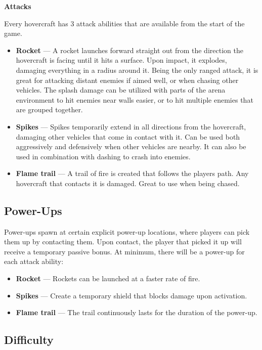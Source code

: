 \documentclass{article}
\theoremstyle{definition}
\begin{document}
\textbf{Attacks}

Every hovercraft has 3 attack abilities that are available from the start of
the game.

\begin{itemize}
  \item \textbf{Rocket} --- A rocket launches forward straight out from the
    direction the hovercraft is facing until it hits a surface. Upon impact, it
    explodes, damaging everything in a radius around it. Being the only ranged
    attack, it is great for attacking distant enemies if aimed well, or when
    chasing other vehicles. The splash damage can be utilized with parts of the
    arena environment to hit enemies near walls easier, or to hit multiple
    enemies that are grouped together.
  \item \textbf{Spikes} --- Spikes temporarily extend in all directions from
    the hovercraft, damaging other vehicles that come in contact with it. Can
    be used both aggressively and defensively when other vehicles are nearby.
    It can also be used in combination with dashing to crash into enemies.
  \item \textbf{Flame trail} --- A trail of fire is created that follows the
    players path. Any hovercraft that contacts it is damaged. Great to use when
    being chased.
\end{itemize}


\subsection{Power-Ups}

Power-ups spawn at certain explicit power-up locations, where players can pick
them up by contacting them. Upon contact, the player that picked it up will
receive a temporary passive bonus. At minimum, there will be a power-up for
each attack ability:
\begin{itemize}
  \item \textbf{Rocket} --- Rockets can be launched at a faster rate of fire.
  \item \textbf{Spikes} --- Create a temporary shield that blocks damage upon
    activation.
  \item \textbf{Flame trail} --- The trail continuously lasts for the duration
    of the power-up.
\end{itemize}

\subsection{Difficulty}
\end{document}
